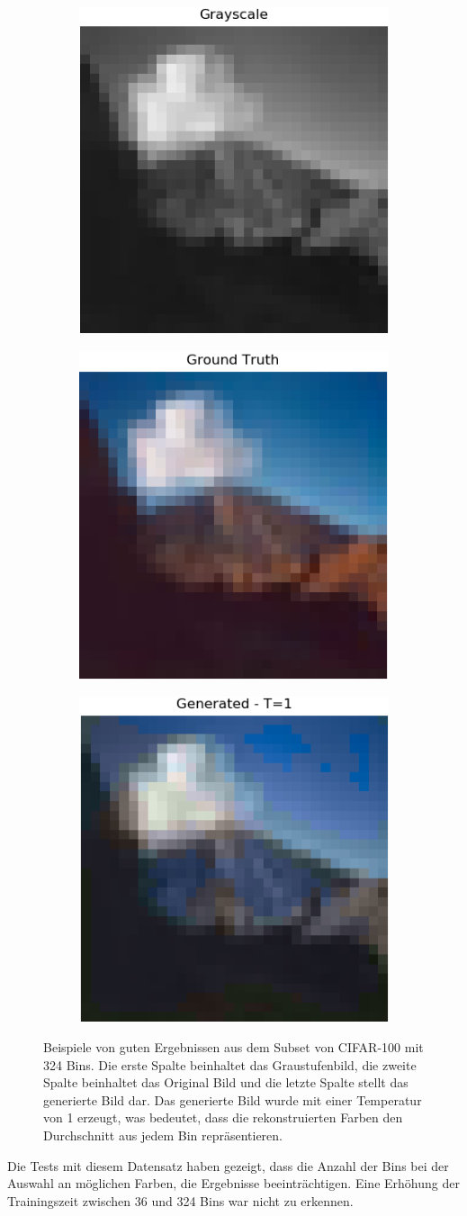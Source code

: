 \begin{figure}[H]
  \begin{subfigure}
    \centering
    \includegraphics[width=.24\textwidth]{resources/experiments/cifar/600_grayscale.png}
  \end{subfigure}
  \begin{subfigure}
    \centering
    \includegraphics[width=.24\textwidth]{resources/experiments/cifar/600_original.png}
  \end{subfigure}
  \begin{subfigure}
    \centering
    \includegraphics[width=.24\textwidth]{resources/experiments/cifar/600_t1.png}
  \end{subfigure}
  \caption{Beispiele von guten Ergebnissen aus dem Subset von CIFAR-100 mit 324 Bins. Die erste Spalte beinhaltet das Graustufenbild, die zweite Spalte
    beinhaltet das Original Bild und die letzte Spalte stellt das generierte Bild dar. Das generierte Bild wurde mit einer Temperatur von 1
    erzeugt, was bedeutet, dass die rekonstruierten Farben den Durchschnitt aus jedem Bin repräsentieren.}
  \label{image:gute-ergebnisse-cifar}
\end{figure}

Die Tests mit diesem Datensatz haben gezeigt, dass die Anzahl der Bins bei der Auswahl an möglichen Farben, die Ergebnisse beeinträchtigen.
Eine Erhöhung der Trainingszeit zwischen 36 und 324 Bins war nicht zu erkennen.


